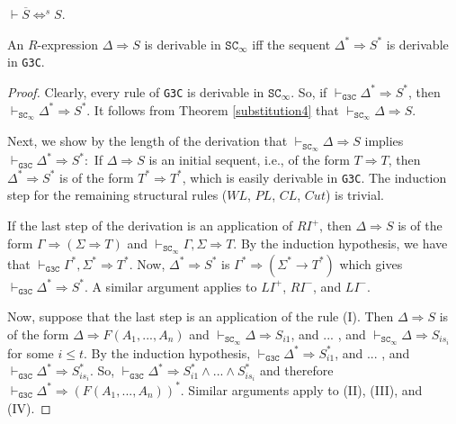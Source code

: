 \documentclass[10pt,a4paper]{amsart}
\begin{document}
\begin{theorem}\label{substitution4} 
$\vdash\overline{S} \Leftrightarrow^{s} S$.
\end{theorem}

\begin{lemma}\label{Lemma}
    An $R$-expression $\Delta\Rightarrow S$ is derivable in $\texttt{SC}_\infty$ iff the sequent $\Delta^*\Rightarrow S^*$ is derivable in \texttt{G3C}.
\end{lemma}

\begin{proof}
    Clearly, every rule of \texttt{G3C} is derivable in $\texttt{SC}_\infty$. So, if $\vdash_{\texttt{G3C}}\Delta^*\Rightarrow S^*$, then $\vdash_{\texttt{SC}_\infty} \Delta^*\Rightarrow S^*$. It follows from Theorem \ref{substitution4} that $\vdash_{\texttt{SC}_\infty} \Delta\Rightarrow S$.

    Next, we show by the length of the derivation that $\vdash_{\texttt{SC}_\infty} \Delta\Rightarrow S$ implies $\vdash_{\texttt{G3C}}\Delta^*\Rightarrow S^*:$ If $\Delta\Rightarrow S$ is an initial sequent, i.e., of the form $T\Rightarrow T$, then $\Delta^* \Rightarrow S^*$ is of the form $T^*\Rightarrow T^*$, 
    which is easily derivable in \texttt{G3C}.
    The induction step for the remaining structural rules ($WL$, $PL$, $CL$, $Cut$) is trivial. 
    
    If the last step of the derivation is an application of $RI^+$, then $\Delta\Rightarrow S$ is of the form  $ \Gamma \Rightarrow (\Sigma \Rightarrow T)$ and $\vdash_{\texttt{SC}_\infty} \Gamma, \Sigma \Rightarrow T$. 
    By the induction hypothesis, we have that $\vdash_{\texttt{G3C}} \Gamma^*, \Sigma^* \Rightarrow T^*$. Now, $\Delta^*\Rightarrow S^*$ is $\Gamma^*\Rightarrow(\Sigma^*\rightarrow T^*)$ which gives $\vdash_{\texttt{G3C}} \Delta^* \Rightarrow S^*$. 
    A similar argument applies to $LI^+$, $RI^-$, and $LI^-$. 

    Now, suppose that the last step is an application of the rule (I). 
    Then $\Delta\Rightarrow S$ is of the form $\Delta \Rightarrow F(A_1,...,A_n)$ and $\vdash_{\texttt{SC}_\infty}\Delta \Rightarrow S_{i 1}$, and ... , and $\vdash_{\texttt{SC}_\infty} \Delta \Rightarrow S_{i s_{i}}$ for some $i\leq t$. 
    By the induction hypothesis, $\vdash_{\texttt{G3C}}\Delta^* \Rightarrow S^*_{i 1}$, and ... , and $\vdash_{\texttt{G3C}} \Delta^* \Rightarrow S^*_{i s_{i}}$. 
    So, $\vdash_{\texttt{G3C}} \Delta^* \Rightarrow S^*_{i 1}\wedge ... \wedge S^*_{i s_{i}}$ and therefore $\vdash_{\texttt{G3C}} \Delta^* \Rightarrow (F(A_1,...,A_n))^*$. 
    Similar arguments apply to (II), (III), and (IV).

\end{proof}
\end{document}
